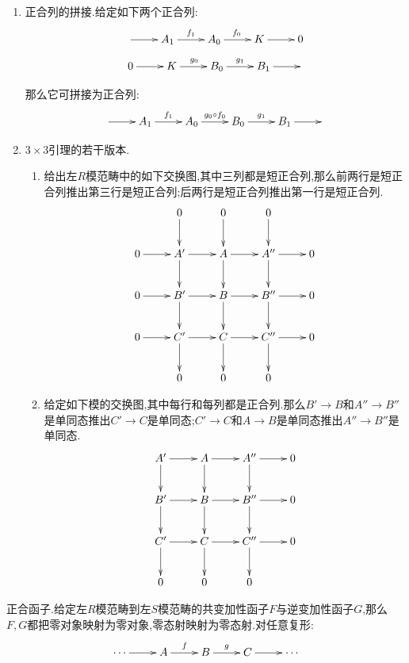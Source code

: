 \begin{enumerate}
\begin{enumerate}
    	那么蛇形引理的结论为:
    	$$\xymatrix{
    		0\ar[r]&\ker\alpha\ar[r]^{f_1'}&\ker\beta\ar[r]^{g_1'}&\ker\gamma\ar[r]^{\delta}&
    		\mathrm{coker}\alpha\ar[r]^{f_0'}&\mathrm{coker}\beta\ar[r]^{g_0'}&\mathrm{coker}\gamma\ar[r]&0}$$
    	\begin{proof}
    		
    		在上一条的基础上,只需在添加条件下再证明$f_1'$是单射和$g_0'$是满射.首先是$f_1'$是单射,如果$a_1\in\ker\alpha\cap\ker f_1$,结合$f_1$是单射就得到$a_1=0$.最后是$g_0'$是满射,任取$c_0+\mathrm{im}\gamma\in\mathrm{coker}\gamma$,按照$g_0$是满射,就存在$b_0\in B_0$使得$g_0(b_0)=c_0$,于是$g_0'(b_0+\mathrm{im}\beta)=c_0+\mathrm{im}\gamma$,于是$g_0'$是满射.
    	\end{proof}
    \end{enumerate}
    \item 正合列的拼接.给定如下两个正合列:
    $$\xymatrix{\ar[r]&A_1\ar[r]^{f_1}&A_0\ar[r]^{f_0}&K\ar[r]&0}$$
    $$\xymatrix{0\ar[r]&K\ar[r]^{g_0}&B_0\ar[r]^{g_1}&B_1\ar[r]&}$$
    
    那么它可拼接为正合列:
    $$\xymatrix{\ar[r]&A_1\ar[r]^{f_1}&A_0\ar[r]^{g_0\circ f_0}&B_0\ar[r]^{g_1}&B_1\ar[r]&}$$
    \item $3\times3$引理的若干版本.
    \begin{enumerate}
    	\item 给出左$R$模范畴中的如下交换图,其中三列都是短正合列,那么前两行是短正合列推出第三行是短正合列;后两行是短正合列推出第一行是短正合列.
    	$$\xymatrix{&0\ar[d]&0\ar[d]&0\ar[d]&\\0\ar[r]&A'\ar[r]\ar[d]&A\ar[r]\ar[d]&A''\ar[r]\ar[d]&0\\0\ar[r]&B'\ar[r]\ar[d]&B\ar[r]\ar[d]&B''\ar[r]\ar[d]&0\\0\ar[r]&C'\ar[r]\ar[d]&C\ar[r]\ar[d]&C''\ar[r]\ar[d]&0\\&0&0&0&}$$
    	\item 给定如下模的交换图,其中每行和每列都是正合列.那么$B'\to B$和$A''\to B''$是单同态推出$C'\to C$是单同态;$C'\to C$和$A\to B$是单同态推出$A''\to B''$是单同态.
    	$$\xymatrix{A'\ar[r]\ar[d]&A\ar[r]\ar[d]&A''\ar[r]\ar[d]&0\\B'\ar[r]\ar[d]&B\ar[r]\ar[d]&B''\ar[r]\ar[d]&0\\C'\ar[r]\ar[d]&C\ar[r]\ar[d]&C''\ar[r]\ar[d]&0\\0&0&0&}$$
    \end{enumerate}
\end{enumerate}

正合函子.给定左$R$模范畴到左$S$模范畴的共变加性函子$F$与逆变加性函子$G$,那么$F,G$都把零对象映射为零对象,零态射映射为零态射.对任意复形:
$$\xymatrix{\cdots\ar[r]&A\ar[r]^f&B\ar[r]^g&C\ar[r]&\cdots}$$


